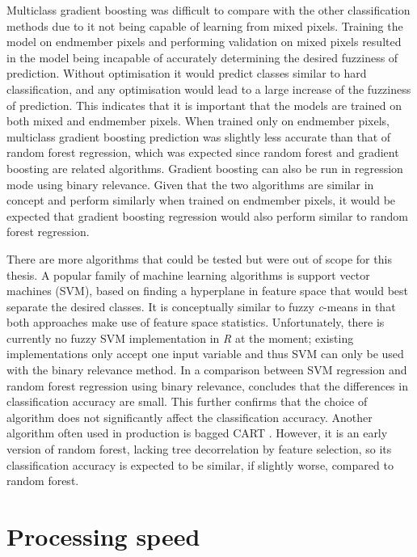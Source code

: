 \documentclass[a4paper,12pt]{scrbook}
\begin{document}
Multiclass gradient boosting was difficult to compare with the other classification methods due to it not being capable of learning from mixed pixels. Training the model on endmember pixels and performing validation on mixed pixels resulted in the model being incapable of accurately determining the desired fuzziness of prediction. Without optimisation it would predict classes similar to hard classification, and any optimisation would lead to a large increase of the fuzziness of prediction. This indicates that it is important that the models are trained on both mixed and endmember pixels. When trained only on endmember pixels, multiclass gradient boosting prediction was slightly less accurate than that of random forest regression, which was expected since random forest and gradient boosting are related algorithms. Gradient boosting can also be run in regression mode using binary relevance. Given that the two algorithms are similar in concept and perform similarly when trained on endmember pixels, it would be expected that gradient boosting regression would also perform similar to random forest regression.

There are more algorithms that could be tested but were out of scope for this thesis. A popular family of machine learning algorithms is support vector machines (SVM), based on finding a hyperplane in feature space that would best separate the desired classes. It is conceptually similar to fuzzy \textit{c}-means in that both approaches make use of feature space statistics. Unfortunately, there is currently no fuzzy SVM implementation in \textit{R} at the moment; existing implementations only accept one input variable and thus SVM can only be used with the binary relevance method. In a comparison between SVM regression and random forest regression using binary relevance, \citet{walton2008subpixelrf} concludes that the differences in classification accuracy are small. This further confirms that the choice of algorithm does not significantly affect the classification accuracy. Another algorithm often used in production is bagged CART \citep{Hansen2016treeheight}. However, it is an early version of random forest, lacking tree decorrelation by feature selection, so its classification accuracy is expected to be similar, if slightly worse, compared to random forest.

\section{Processing speed}
\end{document}

